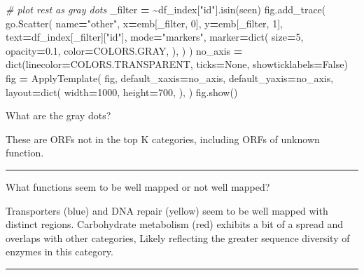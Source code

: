 \documentclass[
]{book}
\newenvironment{Shaded}{\begin{snugshade}}{\end{snugshade}}
\newcommand{\BuiltInTok}[1]{#1}
\newcommand{\CommentTok}[1]{\textcolor[rgb]{0.56,0.35,0.01}{\textit{#1}}}
\newcommand{\DecValTok}[1]{\textcolor[rgb]{0.00,0.00,0.81}{#1}}
\newcommand{\FloatTok}[1]{\textcolor[rgb]{0.00,0.00,0.81}{#1}}
\newcommand{\NormalTok}[1]{#1}
\newcommand{\OperatorTok}[1]{\textcolor[rgb]{0.81,0.36,0.00}{\textbf{#1}}}
\newcommand{\StringTok}[1]{\textcolor[rgb]{0.31,0.60,0.02}{#1}}
\newcommand{\VariableTok}[1]{\textcolor[rgb]{0.00,0.00,0.00}{#1}}
\begin{document}
\begin{Shaded}
\begin{Highlighting}[numbers=left,,]
\CommentTok{\# plot rest as gray dots}
\NormalTok{\_filter }\OperatorTok{=} \OperatorTok{\textasciitilde{}}\NormalTok{df\_index[}\StringTok{"id"}\NormalTok{].isin(seen)}
\NormalTok{fig.add\_trace(}
\NormalTok{    go.Scatter(}
\NormalTok{        name}\OperatorTok{=}\StringTok{"other"}\NormalTok{,}
\NormalTok{        x}\OperatorTok{=}\NormalTok{emb[\_filter, }\DecValTok{0}\NormalTok{],}
\NormalTok{        y}\OperatorTok{=}\NormalTok{emb[\_filter, }\DecValTok{1}\NormalTok{],}
\NormalTok{        text}\OperatorTok{=}\NormalTok{df\_index[\_filter][}\StringTok{"id"}\NormalTok{],}
\NormalTok{        mode}\OperatorTok{=}\StringTok{"markers"}\NormalTok{,}
\NormalTok{        marker}\OperatorTok{=}\BuiltInTok{dict}\NormalTok{(}
\NormalTok{            size}\OperatorTok{=}\DecValTok{5}\NormalTok{, opacity}\OperatorTok{=}\FloatTok{0.1}\NormalTok{,}
\NormalTok{            color}\OperatorTok{=}\NormalTok{COLORS.GRAY,}
\NormalTok{        ),}
\NormalTok{    )}
\NormalTok{)}
\NormalTok{no\_axis }\OperatorTok{=} \BuiltInTok{dict}\NormalTok{(linecolor}\OperatorTok{=}\NormalTok{COLORS.TRANSPARENT, ticks}\OperatorTok{=}\VariableTok{None}\NormalTok{, showticklabels}\OperatorTok{=}\VariableTok{False}\NormalTok{)}
\NormalTok{fig }\OperatorTok{=}\NormalTok{ ApplyTemplate(}
\NormalTok{    fig,}
\NormalTok{    default\_xaxis}\OperatorTok{=}\NormalTok{no\_axis, default\_yaxis}\OperatorTok{=}\NormalTok{no\_axis,}
\NormalTok{    layout}\OperatorTok{=}\BuiltInTok{dict}\NormalTok{(}
\NormalTok{        width}\OperatorTok{=}\DecValTok{1000}\NormalTok{,}
\NormalTok{        height}\OperatorTok{=}\DecValTok{700}\NormalTok{,}
\NormalTok{    ),}
\NormalTok{)}
\NormalTok{fig.show()}
\end{Highlighting}
\end{Shaded}

What are the gray dots?

These are ORFs not in the top K categories, including ORFs of unknown function.

\begin{center}\rule{0.5\linewidth}{0.5pt}\end{center}

What functions seem to be well mapped or not well mapped?

Transporters (blue) and DNA repair (yellow) seem to be well mapped with distinct regions.
Carbohydrate metabolism (red) exhibits a bit of a spread and overlaps with other categories,
Likely reflecting the greater sequence diversity of enzymes in this category.

\begin{center}\rule{0.5\linewidth}{0.5pt}\end{center}
\end{document}
